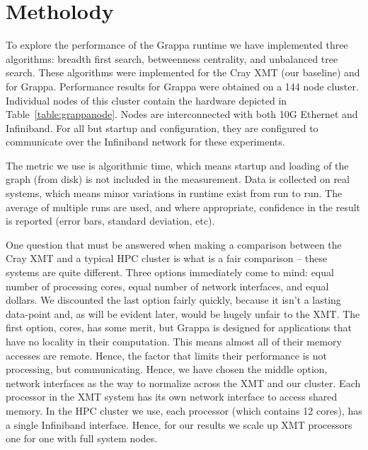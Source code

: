 \section{Metholody} \label{sec:method}

To explore the performance of the Grappa runtime we have implemented three algorithms: breadth first search, betweenness centrality, and unbalanced tree search.  These algorithms were implemented for the Cray XMT (our baseline) and for Grappa.  Performance results for Grappa were obtained on a 144 node cluster.  Individual nodes of this cluster contain the hardware depicted in Table~\ref{table:grappanode}.  Nodes are interconnected with both 10G Ethernet and Infiniband.  For all but startup and configuration, they are configured to communicate over the Infiniband network for these experiments.

The metric we use is algorithmic time, which means startup and loading of the graph (from disk) is not included in the measurement.  Data is collected on real systems, which means minor variations in runtime exist from run to run.  The average of multiple runs are used, and where appropriate, confidence in the result is reported (error bars, standard deviation, etc).

One question that must be answered when making a comparison between the Cray XMT and a typical HPC cluster is what is a fair comparison -- these systems are quite different.  Three options immediately come to mind: equal number of processing cores, equal number of network interfaces, and equal dollars.  We discounted the last option fairly quickly, because it isn't a lasting data-point and, as will be evident later, would be hugely unfair to the XMT.  The first option, cores, has some merit, but Grappa is designed for applications that have no locality in their computation.  This means almost all of their memory accesses are remote.  Hence, the factor that limits their performance is not processing, but communicating.  Hence, we have chosen the middle option, network interfaces as the way to normalize across the XMT and our cluster.  Each processor in the XMT system has its own network interface to access shared memory.  In the HPC cluster we use, each processor (which contains 12 cores), has a single Infiniband interface.  Hence, for our results we scale up XMT processors one for one with full system nodes.

